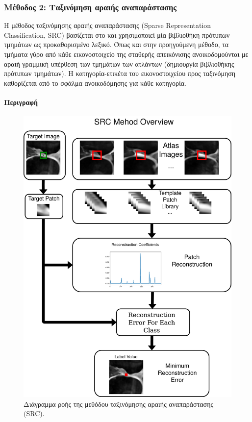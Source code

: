 \documentclass[a4paper,12pt]{article}
\newcommand{\paragraphLine}[1]{\paragraph{#1}\mbox{}}
\begin{document}
\subsubsection{Μέθοδος 2: Ταξινόμηση αραιής αναπαράστασης} \label{SRC:1}

Η μέθοδος ταξινόμησης αραιής αναπαράστασης (Sparse Representation
Classification, SRC) βασίζεται στο \cite{Tong:1} και χρησιμοποιεί μία βιβλιοθήκη
πρότυπων τμημάτων ως προκαθορισμένο λεξικό. Όπως και στην προηγούμενη μέθοδο, τα
τμήματα γύρο από κάθε εικονοστοιχείο της σταθερής απεικόνισης ανοικοδομούνται με
αραιή γραμμική υπέρθεση των τμημάτων των ατλάντων (δημιουργία βιβλιοθήκης
πρότυπων τμημάτων). Η κατηγορία-ετικέτα του εικονοστοιχείου προς ταξινόμηση
καθορίζεται από το σφάλμα ανοικοδόμησης για κάθε κατηγορία.

\paragraphLine{Περιγραφή}

\begin{figure}[H]
    \centering
    \includegraphics[width=\linewidth]{SRC_method.png}
    \caption{Διάγραμμα ροής της μεθόδου ταξινόμησης αραιής αναπαράστασης (SRC).}
    \label{fig:SRC_method:1}
\end{figure}
\end{document}

